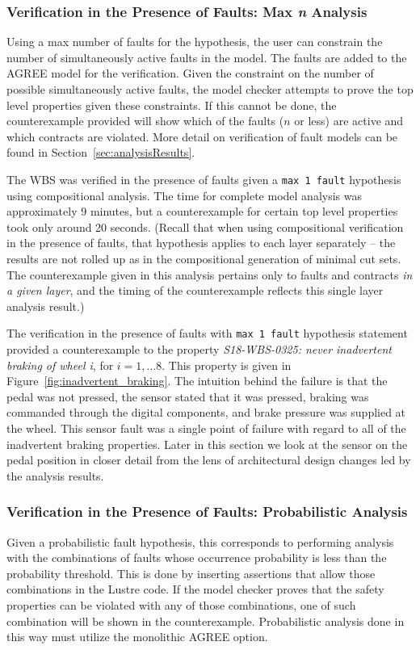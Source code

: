 \subsubsection{Verification in the Presence of Faults: Max \textit{n} Analysis}
Using a max number of faults for the hypothesis, the user can constrain the number of simultaneously active faults in the model. The faults are added to the AGREE model for the verification. Given the constraint on the number of possible simultaneously active faults, the model checker attempts to prove the top level properties given these constraints. If this cannot be done, the counterexample provided will show which of the faults ($n$ or less) are active and which contracts are violated. More detail on verification of fault models can be found in Section~\ref{sec:analysisResults}. 

The WBS was verified in the presence of faults given a \texttt{max 1 fault} hypothesis using compositional analysis. The time for complete model analysis was approximately 9 minutes, but a counterexample for certain top level properties took only around 20 seconds. (Recall that when using compositional verification in the presence of faults, that hypothesis applies to each layer separately -- the results are not rolled up as in the compositional generation of minimal cut sets. The counterexample given in this analysis pertains only to faults and contracts \textit{in a given layer}, and the timing of the counterexample reflects this single layer analysis result.) 

The verification in the presence of faults with \texttt{max 1 fault} hypothesis statement provided a counterexample to the property {\em S18-WBS-0325: never inadvertent braking of wheel i}, for $i = 1, \dots 8$. This property is given in Figure~\ref{fig:inadvertent_braking}. The intuition behind the failure is that the pedal was not pressed, the sensor stated that it was pressed, braking was commanded through the digital components, and brake pressure was supplied at the wheel. This sensor fault was a single point of failure with regard to all of the inadvertent braking properties. Later in this section we look at the sensor on the pedal position in closer detail from the lens of architectural design changes led by the analysis results. 

\subsubsection{Verification in the Presence of Faults: Probabilistic Analysis} 
Given a probabilistic fault hypothesis, this corresponds to performing analysis with the combinations of faults whose occurrence probability is less than the probability threshold. This is done by inserting assertions that allow those combinations in the Lustre code. If the model checker proves that the safety properties can be violated with any of those combinations, one of such combination will be shown in the counterexample. Probabilistic analysis done in this way must utilize the monolithic AGREE option. 

